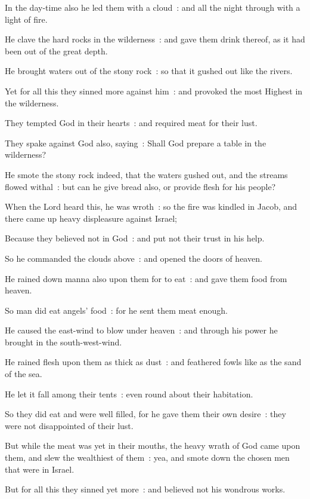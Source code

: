 In the day-time also he led them with a cloud~: and all the night through with a light of fire.\par
{}He clave the hard rocks in the wilderness~: and gave them drink thereof, as it had been out of the great depth.\par
{}He brought waters out of the stony rock~: so that it gushed out like the rivers.\par
{}Yet for all this they sinned more against him~: and provoked the most Highest in the wilderness.\par
{}They tempted God in their hearts~: and required meat for their lust.\par
{}They spake against God also, saying~: Shall God prepare a table in the wilderness?\par
{}He smote the stony rock indeed, that the waters gushed out, and the streams flowed withal~: but can he give bread also, or provide flesh for his people?\par
{}When the Lord heard this, he was wroth~: so the fire was kindled in Jacob, and there came up heavy displeasure against Israel;\par
{}Because they believed not in God~: and put not their trust in his help.\par
{}So he commanded the clouds above~: and opened the doors of heaven.\par
{}He rained down manna also upon them for to eat~: and gave them food from heaven.\par
{}So man did eat angels' food~: for he sent them meat enough.\par
{}He caused the east-wind to blow under heaven~: and through his power he brought in the south-west-wind.\par
{}He rained flesh upon them as thick as dust~: and feathered fowls like as the sand of the sea.\par
{}He let it fall among their tents~: even round about their habitation.\par
{}So they did eat and were well filled, for he gave them their own desire~: they were not disappointed of their lust.\par
{}But while the meat was yet in their mouths, the heavy wrath of God came upon them, and slew the wealthiest of them~: yea, and smote down the chosen men that were in Israel.\par
{}But for all this they sinned yet more~: and believed not his wondrous works.\par

